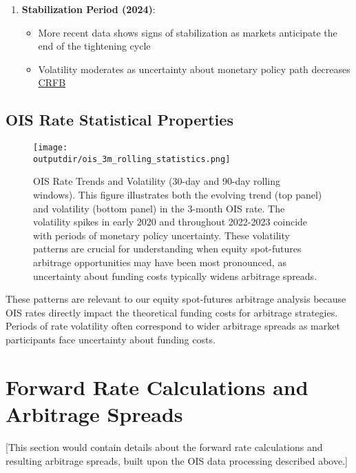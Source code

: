 \documentclass{article}
\newcommand{\outputdir}{../_output}
\begin{document}
\begin{enumerate}
  \item \textbf{Stabilization Period (2024)}:
  \begin{itemize}
    \item More recent data shows signs of stabilization as markets anticipate the end of the tightening cycle
    \item Volatility moderates as uncertainty about monetary policy path decreases \href{https://www.crfb.org/blogs/fed-cuts-rates-treasury-yields-are-rising}{CRFB}
  \end{itemize}
\end{enumerate}

\subsection{OIS Rate Statistical Properties}



\begin{figure}[H]
  \centering
  \texttt{[image: \\outputdir/ois\_3m\_rolling\_statistics.png]}
  \caption{OIS Rate Trends and Volatility (30-day and 90-day rolling windows). This figure illustrates both the evolving trend (top panel) and volatility (bottom panel) in the 3-month OIS rate. The volatility spikes in early 2020 and throughout 2022-2023 coincide with periods of monetary policy uncertainty. These volatility patterns are crucial for understanding when equity spot-futures arbitrage opportunities may have been most pronounced, as uncertainty about funding costs typically widens arbitrage spreads.}
  \label{fig:ois_rolling_stats}
\end{figure}

These patterns are relevant to our equity spot-futures arbitrage analysis because OIS rates directly impact the theoretical funding costs for arbitrage strategies. Periods of rate volatility often correspond to wider arbitrage spreads as market participants face uncertainty about funding costs.

\section{Forward Rate Calculations and Arbitrage Spreads}
[This section would contain details about the forward rate calculations and resulting arbitrage spreads, built upon the OIS data processing described above.]
\end{document}
